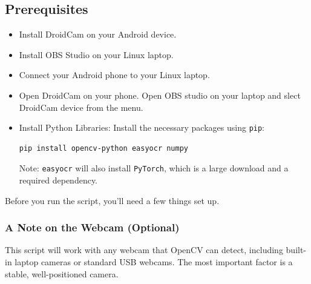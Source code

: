 
\subsection{Prerequisites}\label{prerequisites}
\begin{itemize}
    \item Install DroidCam \cite{droidcam} on your Android device. 
    \item Install OBS Studio \cite{obsstudio} on your Linux laptop. 
    \item Connect your Android phone to  your  Linux laptop.
    \item Open DroidCam on your phone.  Open OBS studio on your laptop and slect DroidCam device from the menu.
    \item {Install Python Libraries:} Install the necessary packages using \texttt{pip}:
    \begin{lstlisting}[language=bash]
    pip install opencv-python easyocr numpy
    \end{lstlisting}
        {Note:} \texttt{easyocr} will also install \texttt{PyTorch\cite{pytorch}}, which is a large download and a required dependency.
\end{itemize}

\iffalse
Before you run the script, you'll need a few things set up.

\subsubsection*{A Note on the Webcam (Optional)}
This script will work with any webcam that OpenCV can detect, including built-in laptop cameras or standard USB webcams. The most important factor is a stable, well-positioned camera.

